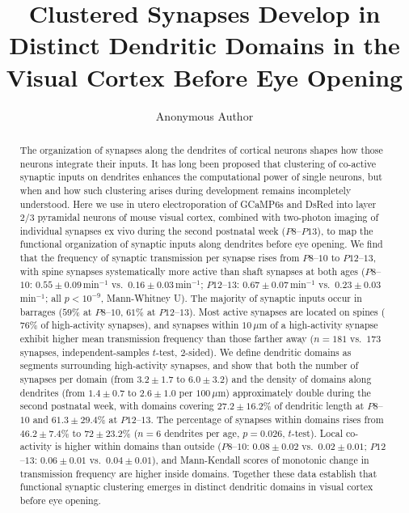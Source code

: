 \documentclass[11pt]{article}
\title{Clustered Synapses Develop in Distinct Dendritic Domains in the Visual Cortex Before Eye Opening}
\author[1]{Anonymous Author}
\affil[1]{Anonymous Institution}
\date{}
\begin{document}
\maketitle

\begin{abstract}
The organization of synapses along the dendrites of cortical neurons shapes how those neurons integrate their inputs. It has long been proposed that clustering of co-active synaptic inputs on dendrites enhances the computational power of single neurons, but when and how such clustering arises during development remains incompletely understood. Here we use in utero electroporation of GCaMP6s and DsRed into layer 2/3 pyramidal neurons of mouse visual cortex, combined with two-photon imaging of individual synapses ex vivo during the second postnatal week ($P8$--$P13$), to map the functional organization of synaptic inputs along dendrites before eye opening. We find that the frequency of synaptic transmission per synapse rises from $P8$--$10$ to $P12$--$13$, with spine synapses systematically more active than shaft synapses at both ages ($P8$--$10$: $0.55 \pm 0.09$\,min$^{-1}$ vs.\ $0.16 \pm 0.03$\,min$^{-1}$; $P12$--$13$: $0.67 \pm 0.07$\,min$^{-1}$ vs.\ $0.23 \pm 0.03$\,min$^{-1}$; all $p < 10^{-9}$, Mann-Whitney U). The majority of synaptic inputs occur in barrages ($59\%$ at $P8$--$10$, $61\%$ at $P12$--$13$). Most active synapses are located on spines ($76\%$ of high-activity synapses), and synapses within $10\,\mu\mathrm{m}$ of a high-activity synapse exhibit higher mean transmission frequency than those farther away ($n = 181$ vs.\ $173$ synapses, independent-samples $t$-test, $2$-sided). We define dendritic domains as segments surrounding high-activity synapses, and show that both the number of synapses per domain (from $3.2 \pm 1.7$ to $6.0 \pm 3.2$) and the density of domains along dendrites (from $1.4 \pm 0.7$ to $2.6 \pm 1.0$ per $100\,\mu\mathrm{m}$) approximately double during the second postnatal week, with domains covering $27.2 \pm 16.2\%$ of dendritic length at $P8$--$10$ and $61.3 \pm 29.4\%$ at $P12$--$13$. The percentage of synapses within domains rises from $46.2 \pm 7.4\%$ to $72 \pm 23.2\%$ ($n = 6$ dendrites per age, $p = 0.026$, $t$-test). Local co-activity is higher within domains than outside ($P8$--$10$: $0.08 \pm 0.02$ vs.\ $0.02 \pm 0.01$; $P12$--$13$: $0.06 \pm 0.01$ vs.\ $0.04 \pm 0.01$), and Mann-Kendall scores of monotonic change in transmission frequency are higher inside domains. Together these data establish that functional synaptic clustering emerges in distinct dendritic domains in visual cortex before eye opening.
\end{abstract}
\end{document}
